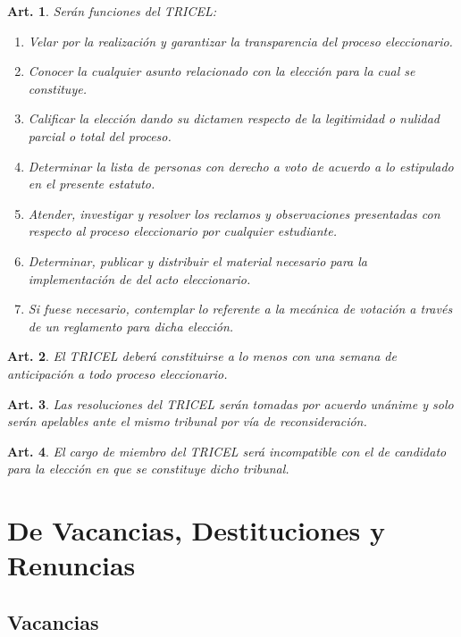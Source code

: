 \documentclass[letterpaper,11pt]{article}
\theoremstyle{plain}
\newtheorem{art}{Art.} %
\begin{document}
\begin{art}\label{TRICELFunciones}
	Serán funciones del TRICEL:
	\begin{enumerate}
		\item Velar por la realización y garantizar la transparencia del proceso eleccionario.
		\item Conocer la cualquier asunto relacionado con la elección para la cual se constituye.
		\item Calificar la elección dando su dictamen respecto de la legitimidad o nulidad parcial o total del proceso.
		\item Determinar la lista de personas con derecho a voto de acuerdo a lo estipulado en el presente estatuto.
		\item Atender, investigar y resolver los reclamos y observaciones presentadas con respecto al proceso eleccionario por cualquier estudiante.
		\item Determinar, publicar y distribuir el material necesario para la implementación de del acto eleccionario.
		\item Si fuese necesario, contemplar lo referente a la mecánica de votación a través de un reglamento para dicha elección.
	\end{enumerate}
\end{art}

\begin{art}\label{TRICELFecha}
	El TRICEL deberá constituirse a lo menos con una semana de anticipación a todo proceso eleccionario.
\end{art}

\begin{art}\label{TRICELResolucion}
	Las resoluciones del TRICEL serán tomadas por acuerdo unánime y solo serán apelables ante el mismo tribunal por vía de reconsideración.
\end{art}

\begin{art}\label{TRICELExcepciones}
	El cargo de miembro del TRICEL será incompatible con el de candidato para la elección en que se constituye dicho tribunal.
\end{art}

\section{De Vacancias, Destituciones y Renuncias}\label{vacancias}
\subsection{Vacancias}\label{vacancias}
\end{document}
